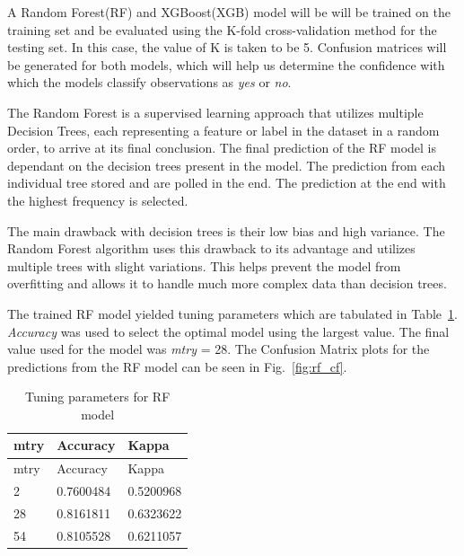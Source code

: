 \documentclass[runningheads]{llncs}
\makeatletter
\let\oldsubsubsection\subsubsection
\renewcommand\subsubsection{\@ifstar{\oldsubsubsection}{\oldsubsubsection*}}
\makeatother
\begin{document}
A Random Forest(RF) and XGBoost(XGB) model will be will be trained on
the training set and be evaluated using the K-fold cross-validation
method for the testing set. In this case, the value of K is taken to be
5. Confusion matrices will be generated for both models, which will help
us determine the confidence with which the models classify observations
as \emph{yes} or \emph{no}.

\hypertarget{random-forest}{%
\subsubsection{Random Forest}\label{random-forest}}

The Random Forest is a supervised learning approach that utilizes
multiple Decision Trees, each representing a feature or label in the
dataset in a random order, to arrive at its final conclusion. The final
prediction of the RF model is dependant on the decision trees present in
the model. The prediction from each individual tree stored and are
polled in the end. The prediction at the end with the highest frequency
is selected.

The main drawback with decision trees is their low bias and high
variance. The Random Forest algorithm uses this drawback to its
advantage and utilizes multiple trees with slight variations. This helps
prevent the model from overfitting and allows it to handle much more
complex data than decision trees.

The trained RF model yielded tuning parameters which are tabulated in
Table~\ref{tbl:rf_params}. \emph{Accuracy} was used to select the optimal
model using the largest value. The final value used for the model was
\emph{mtry} = 28. The Confusion Matrix plots for the predictions from
the RF model can be seen in Fig.~\ref{fig:rf_cf}.

\hypertarget{tbl:rf_params}{}
\begin{longtable}[]{@{}lll@{}}
\caption{\label{tbl:rf_params}Tuning parameters for RF
model}\tabularnewline
\toprule
mtry & Accuracy & Kappa\tabularnewline
\midrule
\endfirsthead
\toprule
mtry & Accuracy & Kappa\tabularnewline
\midrule
\endhead
2 & 0.7600484 & 0.5200968\tabularnewline
28 & 0.8161811 & 0.6323622\tabularnewline
54 & 0.8105528 & 0.6211057\tabularnewline
\bottomrule
\end{longtable}
\end{document}
